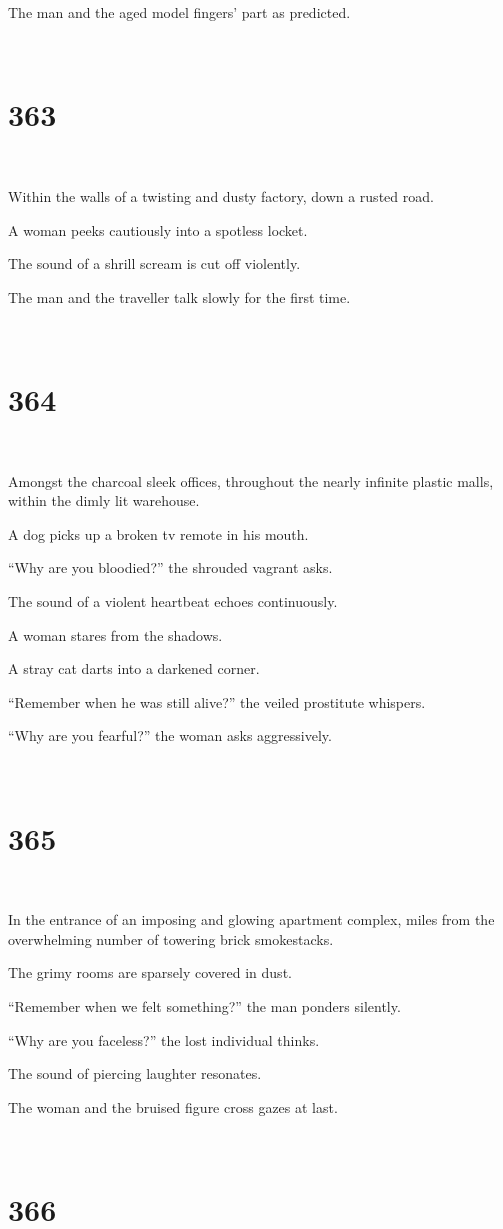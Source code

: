 \documentclass{report}
\begin{document}
The man and the aged model fingers' part as predicted.

~
\chapter*{363}
~

Within the walls of a twisting and dusty factory, down a rusted road.

A woman peeks cautiously into a spotless locket.

The sound of a shrill scream is cut off violently.

The man and the traveller talk slowly for the first time.

~
\chapter*{364}
~

Amongst the charcoal sleek offices, throughout the nearly infinite plastic malls, within the dimly lit warehouse.

A dog picks up a broken tv remote in his mouth.

``Why are you bloodied?'' the shrouded vagrant asks.

The sound of a violent heartbeat echoes continuously.

A woman stares from the shadows.

A stray cat darts into a darkened corner.

``Remember when he was still alive?'' the veiled prostitute whispers.

``Why are you fearful?'' the woman asks aggressively.

~
\chapter*{365}
~

In the entrance of an imposing and glowing apartment complex, miles from the overwhelming number of towering brick smokestacks.

The grimy rooms are sparsely covered in dust.

``Remember when we felt something?'' the man ponders silently.

``Why are you faceless?'' the lost individual thinks.

The sound of piercing laughter resonates.

The woman and the bruised figure cross gazes at last.

~
\chapter*{366}
~
\end{document}
